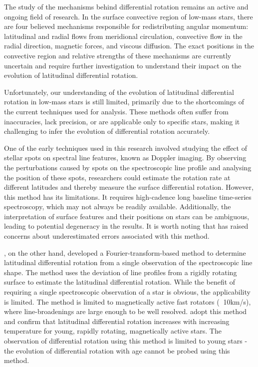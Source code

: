 The study of the mechanisms behind differential rotation remains an active and ongoing field of research. 
In the surface convective region of low-mass stars, there are four believed mechanisms responsible for redistributing angular momentum: latitudinal and radial flows from meridional circulation, convective flow in the radial direction, magnetic forces, and viscous diffusion. 
The exact positions in the convective region and relative strengths of these mechanisms are currently uncertain and require further investigation to understand their impact on the evolution of latitudinal differential rotation.

Unfortunately, our understanding of the evolution of latitudinal differential rotation in low-mass stars is still limited, primarily due to the shortcomings of the current techniques used for analysis. These methods often suffer from inaccuracies, lack precision, or are applicable only to specific stars, making it challenging to infer the evolution of differential rotation accurately.

One of the early techniques used in this research involved studying the effect of stellar spots on spectral line features, known as Doppler imaging. 
By observing the perturbations caused by spots on the spectroscopic line profile and analysing the position of these spots, researchers could estimate the rotation rate at different latitudes and thereby measure the surface differential rotation. However, this method has its limitations. It requires high-cadence long baseline time-series spectroscopy, which may not always be readily available. Additionally, the interpretation of surface features and their positions on stars can be ambiguous, leading to potential degeneracy in the results. 
It is worth noting that \citet{collier_differential_2007} has raised concerns about underestimated errors associated with this method.

\citet{reiners_rotation_2002}, on the other hand, developed a Fourier-transform-based method to determine latitudinal differential rotation from a single observation of the spectroscopic line shape.
The method uses the deviation of line profiles from a rigidly rotating surface to estimate the latitudinal differential rotation.
While the benefit of requiring a single spectroscopic observation of a star is obvious, the applicability is limited.
The method is limited to magnetically active fast rotators (\vsini $\>$ 10km/s), where line-broadenings are large enough to be well resolved.
\citet{barnes_dependence_2005, reiners_rotation_2002} adopt this method and confirm that latitudinal differential rotation increases with increasing temperature for young, rapidly rotating, magnetically active stars.
The observation of differential rotation using this method is limited to young stars - the evolution of differential rotation with age cannot be probed using this method.

